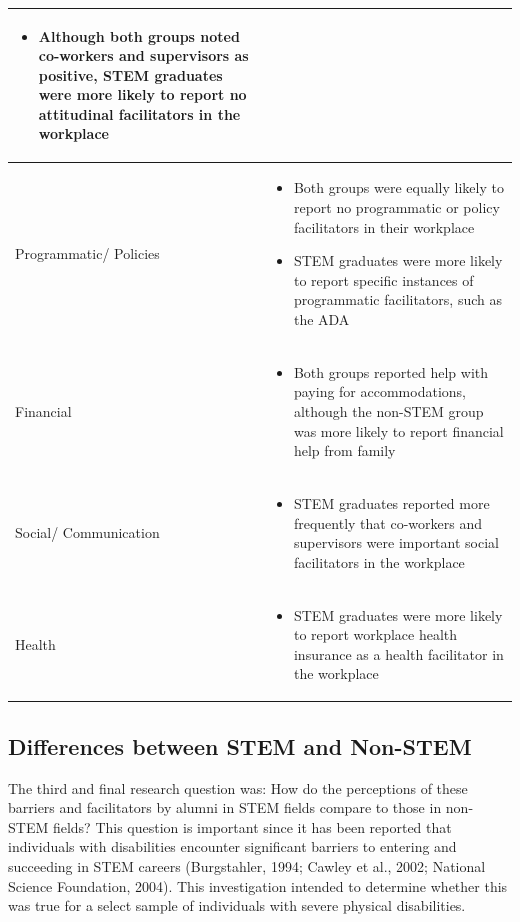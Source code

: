 \documentclass[11.5pt]{sig-alternate} %
\begin{document}
\begin{large}
\begin{table}[thp]
\begin{tabular}{|l|l|}
\begin{itemize}[noitemsep, topsep=0pt, leftmargin=*]
\item Although both groups noted co-workers and supervisors as positive, STEM graduates were more likely to report no attitudinal facilitators in the workplace
\end{itemize} \\ \hline
Programmatic/ Policies &
\begin{itemize}[noitemsep, topsep=0pt, leftmargin=*]
\item Both groups were equally likely to report no programmatic or policy facilitators in their workplace
\item STEM graduates were more likely to report specific instances of programmatic facilitators, such as the ADA
\end{itemize} \\ \hline
Financial &
\begin{itemize}[noitemsep, topsep=0pt, leftmargin=*]
\item Both groups reported help with paying for accommodations, although the non-STEM group was more likely to report financial help from family
\end{itemize} \\ \hline
Social/ Communication &
\begin{itemize}[noitemsep, topsep=0pt, leftmargin=*]
\item STEM graduates reported more frequently that co-workers and supervisors were important social facilitators in the workplace
\end{itemize} \\ \hline
Health &
\begin{itemize}[noitemsep, topsep=0pt, leftmargin=*]
\item STEM graduates were more likely to report workplace health insurance as a health facilitator in the workplace
\end{itemize} \\ \hline
\end{tabular}
\end{table}

\subsection*{Differences between STEM and Non-STEM}
The third and final research question was: How do the perceptions of these barriers and facilitators by alumni in STEM fields compare to those in non-STEM fields? This question is important since it has been reported that individuals with disabilities encounter significant barriers to entering and succeeding in STEM careers (Burgstahler, 1994; Cawley et al., 2002; National Science Foundation, 2004). This investigation intended to determine whether this was true for a select sample of individuals with severe physical disabilities.


\end{large}
\end{document}
